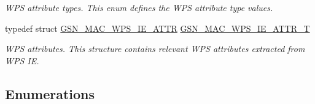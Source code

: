 \begin{DoxyCompactItemize}
\begin{DoxyCompactList}\small\item\em WPS attribute types. This enum defines the WPS attribute type values. \end{DoxyCompactList}\item 
typedef struct \hyperlink{a00138}{GSN\_\-MAC\_\-WPS\_\-IE\_\-ATTR} \hyperlink{a00642_gab0287dd9aaabe07cf4313a9d8a14dcca}{GSN\_\-MAC\_\-WPS\_\-IE\_\-ATTR\_\-T}
\begin{DoxyCompactList}\small\item\em WPS attributes. This structure contains relevant WPS attributes extracted from WPS IE. \end{DoxyCompactList}\end{DoxyCompactItemize}
\subsection*{Enumerations}
